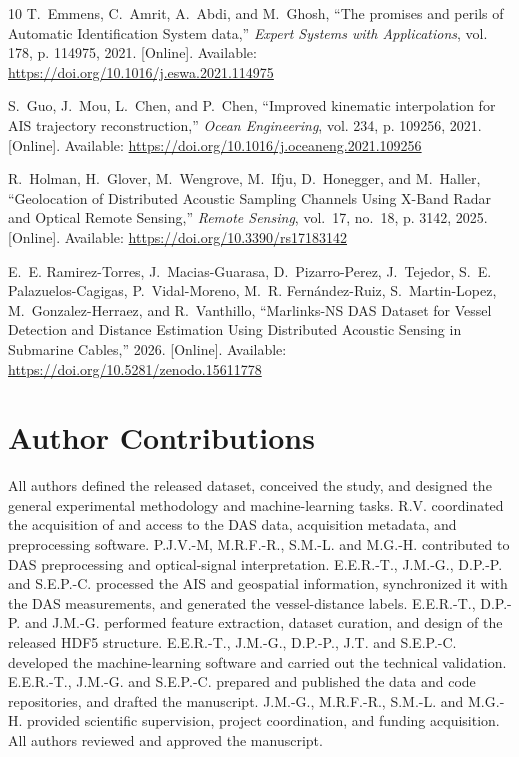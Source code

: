 \documentclass[11pt]{article}
\begin{document}
\begin{thebibliography}{10}
\BIBentryALTinterwordspacing
T.~Emmens, C.~Amrit, A.~Abdi, and M.~Ghosh, ``{The promises and perils of
  Automatic Identification System data},'' \emph{Expert Systems with
  Applications}, vol. 178, p. 114975, 2021. [Online]. Available:
  \url{https://doi.org/10.1016/j.eswa.2021.114975}
\BIBentrySTDinterwordspacing

\BIBentryALTinterwordspacing
S.~Guo, J.~Mou, L.~Chen, and P.~Chen, ``{Improved kinematic interpolation for
  AIS trajectory reconstruction},'' \emph{Ocean Engineering}, vol. 234, p.
  109256, 2021. [Online]. Available:
  \url{https://doi.org/10.1016/j.oceaneng.2021.109256}
\BIBentrySTDinterwordspacing

\BIBentryALTinterwordspacing
R.~Holman, H.~Glover, M.~Wengrove, M.~Ifju, D.~Honegger, and M.~Haller,
  ``{Geolocation of Distributed Acoustic Sampling Channels Using X-Band Radar
  and Optical Remote Sensing},'' \emph{Remote Sensing}, vol.~17, no.~18, p.
  3142, 2025. [Online]. Available: \url{https://doi.org/10.3390/rs17183142}
\BIBentrySTDinterwordspacing

\BIBentryALTinterwordspacing
E.~E. Ramirez-Torres, J.~Macias-Guarasa, D.~Pizarro-Perez, J.~Tejedor, S.~E.
  Palazuelos-Cagigas, P.~Vidal-Moreno, M.~R. Fernández-Ruiz, S.~Martin-Lopez,
  M.~Gonzalez-Herraez, and R.~Vanthillo, ``{Marlinks-NS DAS Dataset for Vessel
  Detection and Distance Estimation Using Distributed Acoustic Sensing in
  Submarine Cables},'' 2026. [Online]. Available:
  \url{https://doi.org/10.5281/zenodo.15611778}
\BIBentrySTDinterwordspacing

\end{thebibliography}


\section*{Author Contributions}

All authors defined the released dataset, conceived the study, and designed the general experimental methodology and machine-learning tasks. R.V. coordinated the acquisition of and access to the DAS data, acquisition metadata, and preprocessing software. P.J.V.-M, M.R.F.-R., S.M.-L. and M.G.-H. contributed to DAS preprocessing and optical-signal interpretation. E.E.R.-T., J.M.-G., D.P.-P. and S.E.P.-C. processed the AIS and geospatial information, synchronized it with the DAS measurements, and generated the vessel-distance labels. E.E.R.-T., D.P.-P. and J.M.-G. performed feature extraction, dataset curation, and design of the released HDF5 structure. E.E.R.-T., J.M.-G., D.P.-P., J.T. and S.E.P.-C. developed the machine-learning software and carried out the technical validation. E.E.R.-T., J.M.-G. and S.E.P.-C. prepared and published the data and code repositories, and drafted the manuscript. J.M.-G., M.R.F.-R., S.M.-L. and M.G.-H. provided scientific supervision, project coordination, and funding acquisition. All authors reviewed and approved the manuscript.
\end{document}
